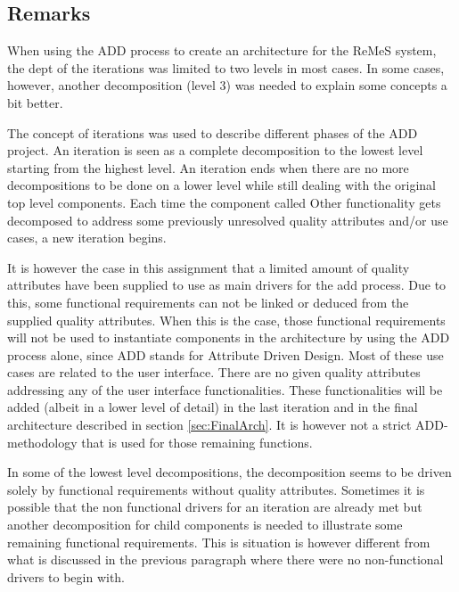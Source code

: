 \subsection{Remarks}
When using the ADD process to create an architecture for the ReMeS system, 
the dept of the iterations was limited to two levels in most cases. 
In some cases, however, another decomposition (level 3) was needed to explain some 
concepts a bit better. 

The concept of iterations was used to describe different phases of the ADD project.
An iteration is seen as a complete decomposition to the lowest level starting from the
highest level. An iteration ends when there are no more decompositions to be done on a lower level
while still dealing with the original top level components.
Each time the component called Other functionality gets decomposed to address some previously unresolved
quality attributes and/or use cases, a new iteration begins.

It is however the case in this assignment that a limited amount of quality attributes have been supplied
to use as main drivers for the add process. Due to this, some functional requirements can not be linked
or deduced from the supplied quality attributes. When this is the case, those functional requirements will not 
be used to instantiate components in the architecture by using the ADD process alone, since ADD stands for 
Attribute Driven Design. 
Most of these use cases are related to the user interface. There are no given quality attributes addressing 
any of the user interface functionalities. These functionalities will be added (albeit in a lower level of detail) in the last iteration
and in the final architecture described in section \ref{sec:FinalArch}. It is however not a strict ADD-methodology that is used for those remaining functions.

In some of the lowest level decompositions, the decomposition seems to be driven solely by functional requirements without quality attributes. 
Sometimes it is possible that the non functional drivers for an iteration are already met but another decomposition for child components is needed to illustrate some remaining functional requirements. This is situation is however different from what is discussed in the previous paragraph where there were no non-functional drivers to begin with.

